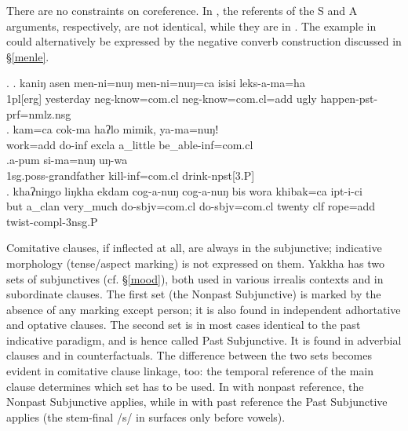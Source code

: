 There are no constraints on coreference. In \Next[a], the referents of the  S and A arguments, respectively, are not identical, while  they are in \Next[b]. The example in \Next[a] could alternatively be expressed by the negative converb construction discussed  in §\ref{menle}. 
		
\ex. \ag.	kaniŋ asen      men-ni=nuŋ         men-ni=nuŋ=ca                isisi leks-a-ma=ha\\
{\sc  1pl[erg]} yesterday {\sc neg-}know{\sc =com.cl} {\sc neg-}know{\sc =com.cl=add} ugly happen{\sc [3sg]-pst-prf=nmlz.nsg}\\
 
\bg. kam=ca         cok-ma            haʔlo mimik,   ya-ma=nuŋǃ\\
work{\sc =add} do{\sc -inf} {\sc excla} a\_little be\_able{\sc -inf=com.cl}\\
   
\bg.a-pum si-ma=nuŋ uŋ-wa\\
{\sc 1sg.poss-}grandfather kill{\sc -inf=com.cl} drink{\sc -npst[3.P]}\\
	   \bg.	khaʔniŋgo liŋkha   ekdam     cog-a-nuŋ        cog-a-nuŋ       bis  wora khibak=ca  ipt-i-ci\\
	but a\_clan very\_much do{\sc [3sg]-sbjv=com.cl} do{\sc [3sg]-sbjv=com.cl} twenty {\sc clf}  rope{\sc =add} twist{\sc [3sg.A]-compl-3nsg.P}\\
		 	


Comitative clauses, if inflected at all, are always in the subjunctive; indicative morphology (tense/aspect marking) is not expressed on them. Yakkha has two sets of subjunctives (cf. §\ref{mood}), both used in various irrealis contexts and in subordinate clauses. The first set (the Nonpast Subjunctive) is marked by the absence of any marking except person; it is also found in independent adhortative and optative clauses. The second set is in most cases identical to the past indicative paradigm, and is hence called Past Subjunctive. It is found in adverbial clauses and in counterfactuals. The difference between the two sets becomes evident in comitative clause linkage, too: the temporal reference of the main clause determines which set has to be used. In \Next[a] with nonpast reference, the Nonpast Subjunctive applies, while in \Next[b] with past reference the Past Subjunctive applies (the stem-final /s/ in \Next[b] surfaces only before vowels).


